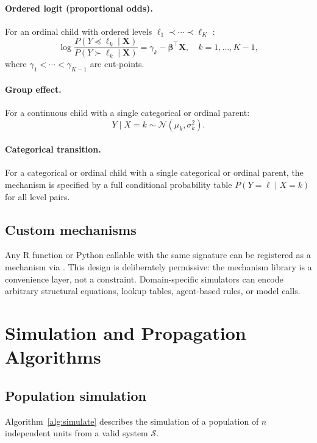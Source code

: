 \documentclass[article]{jss}
\begin{document}
\paragraph{Ordered logit (proportional odds).} For an ordinal child with ordered levels $\ell_1 \prec \cdots \prec \ell_K$ \citep{mccullagh1980regression}:
\[
\log \frac{P(Y \preceq \ell_k \mid \mathbf{X})}{P(Y \succ \ell_k \mid \mathbf{X})} = \gamma_k - \boldsymbol{\beta}^\top \mathbf{X}, \quad k = 1, \ldots, K-1,
\]
where $\gamma_1 < \cdots < \gamma_{K-1}$ are cut-points.

\paragraph{Group effect.} For a continuous child with a single categorical or ordinal parent:
\[
Y \mid X = k \sim \mathcal{N}(\mu_k, \sigma_k^2).
\]

\paragraph{Categorical transition.} For a categorical or ordinal child with a single categorical or ordinal parent, the mechanism is specified by a full conditional probability table $P(Y = \ell \mid X = k)$ for all level pairs.

\subsection{Custom mechanisms}

Any R function  or Python callable with the same signature can be registered as a mechanism via . This design is deliberately permissive: the mechanism library is a convenience layer, not a constraint. Domain-specific simulators can encode arbitrary structural equations, lookup tables, agent-based rules, or model calls.

\section{Simulation and Propagation Algorithms}
\label{sec:simulation}

\subsection{Population simulation}

Algorithm~\ref{alg:simulate} describes the simulation of a population of $n$ independent units from a valid system $\mathcal{S}$.
\end{document}
